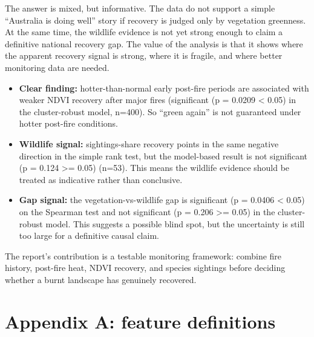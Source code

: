 \documentclass[
  letterpaper,
  DIV=11,
  numbers=noendperiod]{scrartcl}
\providecommand{\tightlist}{%
  \setlength{\itemsep}{0pt}\setlength{\parskip}{0pt}}
\begin{document}
The answer is mixed, but informative. The data do not support a simple
``Australia is doing well'' story if recovery is judged only by
vegetation greenness. At the same time, the wildlife evidence is not yet
strong enough to claim a definitive national recovery gap. The value of
the analysis is that it shows where the apparent recovery signal is
strong, where it is fragile, and where better monitoring data are
needed.

\begin{itemize}
\tightlist
\item
  \textbf{Clear finding:} hotter-than-normal early post-fire periods are
  associated with weaker NDVI recovery after major fires (significant (p
  = 0.0209 \textless{} 0.05) in the cluster-robust model, n=400). So
  ``green again'' is not guaranteed under hotter post-fire conditions.
\item
  \textbf{Wildlife signal:} sightings-share recovery points in the same
  negative direction in the simple rank test, but the model-based result
  is not significant (p = 0.124 \textgreater= 0.05) (n=53). This means
  the wildlife evidence should be treated as indicative rather than
  conclusive.
\item
  \textbf{Gap signal:} the vegetation-vs-wildlife gap is significant (p
  = 0.0406 \textless{} 0.05) on the Spearman test and not significant (p
  = 0.206 \textgreater= 0.05) in the cluster-robust model. This suggests
  a possible blind spot, but the uncertainty is still too large for a
  definitive causal claim.
\end{itemize}

The report's contribution is a testable monitoring framework: combine
fire history, post-fire heat, NDVI recovery, and species sightings
before deciding whether a burnt landscape has genuinely recovered.

\section{Appendix A: feature
definitions}\label{appendix-a-feature-definitions}
\end{document}
